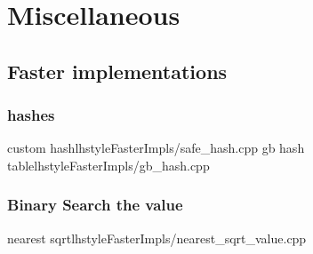 \section{Miscellaneous}
    \subsection{Faster implementations}
      \subsubsection{hashes}
         {custom hash}{lhstyle}{FasterImpls/safe_hash.cpp}
         {gb hash table}{lhstyle}{FasterImpls/gb_hash.cpp}
      \subsubsection{Binary Search the value}
         {nearest sqrt}{lhstyle}{FasterImpls/nearest_sqrt_value.cpp}


